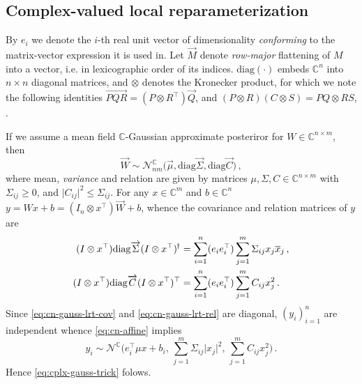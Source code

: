 \documentclass[a4paper,10pt]{article}
\newcommand{\cplx}{\mathbb{C}}
\newcommand{\hop}{{\mkern-1.5mu\dagger}}
\newcommand{\conj}[1]{\overline{#1}}
\renewcommand{\vec}[1]{\overrightarrow{#1}}
\newcommand{\diag}[1]{\mathrm{diag}{#1}}
\begin{document}
\subsection{Complex-valued local reparameterization} %
\label{sub:complex_valued_local_reparameterization}

By $e_i$ we denote the $i$-th real unit vector of dimensionality \textit{conforming} to the
matrix-vector expression it is used in. Let $\vec{M}$ denote \textit{row-major} flattening
of $M$ into a vector, i.e. in lexicographic order of its indices. $\diag{(\cdot)}$ embeds
$\cplx^n$ into $n\times n$ diagonal matrices, and $\otimes$ denotes the Kronecker product,
for which we note the following identities $
  \vec{P Q R} = (P \otimes R^\top) \vec{Q}
$, and $
  (P \otimes R) (C \otimes S) = P Q \otimes R S
$, \citep{petersen_matrix_2012}.

If we assume a mean field $\cplx$-Gaussian approximate posteriror for $
  W \in \cplx^{n\times m}
$, then
\begin{equation}  \label{eq:c-gauss-vi-general}
  \vec{W}
    \sim \mathcal{N}^{\cplx}_{nm} \bigl(
      \vec{\mu}, \diag{\vec{\Sigma}}, \diag{\vec{C}}
    \bigr)
  \,,
\end{equation}
where mean, \textit{variance} and relation are given by matrices $
  \mu, \Sigma, C \in \cplx^{n\times m}
$ with $\Sigma_{ij} \geq 0$, and $
  \lvert C_{ij} \rvert^2 \leq \Sigma_{ij}
$. For any $x \in \cplx^m$ and $b\in \cplx^n$ $
  y = W x + b
    = (I_n \otimes x^\top) \vec{W} + b
$, whence the covariance and relation matrices of $y$ are
\begin{align}
  (I \otimes x^\top) \diag{\vec{\Sigma}} (I \otimes x^\top)^{\hop}
    & = \sum_{i=1}^n (e_i e_i^\top) \sum_{j=1}^m \Sigma_{ij} x_j \conj{x}_j
    \,,  \label{eq:cn-gauss-lrt-cov} \\
  (I \otimes x^\top) \diag{\vec{C}} (I \otimes x^\top)^\top
    & = \sum_{i=1}^n (e_i e_i^\top) \sum_{j=1}^m C_{ij} x_j^2
    \,.  \label{eq:cn-gauss-lrt-rel}
\end{align}
Since \eqref{eq:cn-gauss-lrt-cov} and \eqref{eq:cn-gauss-lrt-rel} are diagonal, $(y_i)_{i=1}^n$
are independent whence \eqref{eq:cn-affine} implies
\begin{equation}  \label{eq:cplx-gauss-trick}
  y_i
    \sim \mathcal{N}^{\cplx}
      \bigl(
        e_i^\top \mu x + b_i,
        \, \sum_{j=1}^m \Sigma_{ij} \lvert x_j \rvert^2,
        \, \sum_{j=1}^m C_{ij} x_j^2
      \bigr)
    \,.
\end{equation}
Hence \eqref{eq:cplx-gauss-trick} folows.
\end{document}
